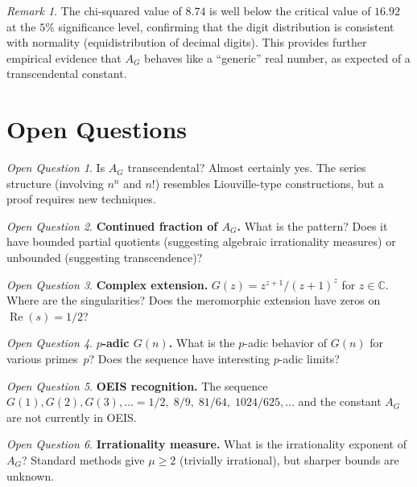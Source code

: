 \documentclass[11pt,a4paper]{article}
\theoremstyle{definition}
\theoremstyle{remark}
\newtheorem{remark}[theorem]{Remark}
\newtheorem{openquestion}{Open Question}
\newcommand{\AG}{A_G}
\begin{document}
\begin{remark}
The chi-squared value of $8.74$ is well below the critical value of $16.92$ at the $5\%$ significance level, confirming that the digit distribution is consistent with normality (equidistribution of decimal digits). This provides further empirical evidence that $\AG$ behaves like a ``generic'' real number, as expected of a transcendental constant.
\end{remark}

\section{Open Questions}\label{sec:open}

\begin{openquestion}
Is $\AG$ transcendental? Almost certainly yes. The series structure (involving $n^{n}$ and $n!$) resembles Liouville-type constructions, but a proof requires new techniques.
\end{openquestion}

\begin{openquestion}
\textbf{Continued fraction of $\AG$.} What is the pattern? Does it have bounded partial quotients (suggesting algebraic irrationality measures) or unbounded (suggesting transcendence)?
\end{openquestion}

\begin{openquestion}
\textbf{Complex extension.} $G(z)=z^{z+1}/(z+1)^{z}$ for $z\in\mathbb{C}$. Where are the singularities? Does the meromorphic extension have zeros on $\operatorname{Re}(s)=1/2$?
\end{openquestion}

\begin{openquestion}
\textbf{$p$-adic $G(n)$.} What is the $p$-adic behavior of $G(n)$ for various primes~$p$? Does the sequence have interesting $p$-adic limits?
\end{openquestion}

\begin{openquestion}
\textbf{OEIS recognition.} The sequence $G(1),G(2),G(3),\ldots = 1/2,\;8/9,\;81/64,\;1024/625,\ldots$ and the constant $\AG$ are not currently in OEIS.
\end{openquestion}

\begin{openquestion}
\textbf{Irrationality measure.} What is the irrationality exponent of $\AG$? Standard methods give $\mu\ge 2$ (trivially irrational), but sharper bounds are unknown.
\end{openquestion}
\end{document}

